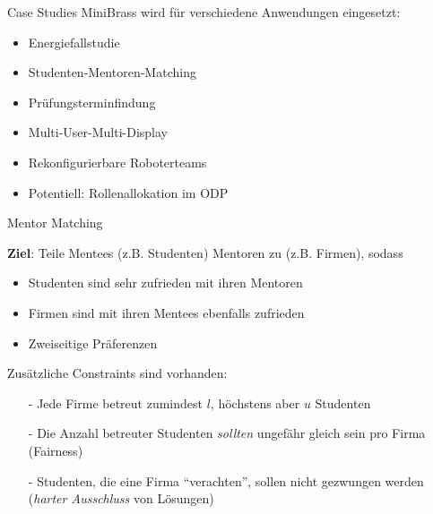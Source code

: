 
\begin{frame}{Case Studies}
MiniBrass wird für verschiedene Anwendungen eingesetzt:

\vspace*{2ex}

\begin{itemize}
\item \alert<2->{Energiefallstudie}
\item \alert<2->{Studenten-Mentoren-Matching}
\item \alert<2->{Prüfungsterminfindung}
\item \alert<2->{Multi-User-Multi-Display}
\item Rekonfigurierbare Roboterteams
\item Potentiell: Rollenallokation im ODP
\end{itemize}
\end{frame}

\begin{frame}[fragile]{Mentor Matching}

\textbf{Ziel}: Teile Mentees (z.B. Studenten) Mentoren zu (z.B. Firmen), sodass
\begin{itemize}
\item Studenten sind sehr zufrieden mit ihren Mentoren
\item Firmen sind mit ihren Mentees ebenfalls zufrieden
\item Zweiseitige Präferenzen
\end{itemize}

\vspace*{2ex}

Zusätzliche Constraints sind vorhanden:

\begin{itemize}
\item[-] Jede Firme betreut zumindest $l$, höchstens aber $u$ Studenten
\item[-] Die Anzahl betreuter Studenten \emph{sollten} ungefähr gleich sein pro Firma (Fairness)
\item[-] Studenten, die eine Firma ``verachten'', sollen nicht gezwungen werden (\emph{harter Ausschluss} von Lösungen)
\end{itemize}
\end{frame}


